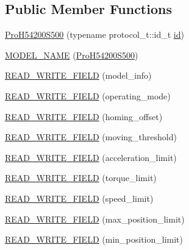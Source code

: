 \subsection*{Public Member Functions}
\begin{DoxyCompactItemize}
\item 
\hyperlink{classdynamixel_1_1servos_1_1_pro_h54200_s500_ac543de875d6b8b796b5ac5262f812b09}{Pro\+H54200\+S500} (typename protocol\+\_\+t\+::id\+\_\+t \hyperlink{classdynamixel_1_1servos_1_1_servo_a2d022081672e25a7bb57b76706e1cc57}{id})
\item 
\hyperlink{classdynamixel_1_1servos_1_1_pro_h54200_s500_ad276df94bdb9b19df85e59d4dda3cf92}{M\+O\+D\+E\+L\+\_\+\+N\+A\+ME} (\hyperlink{classdynamixel_1_1servos_1_1_pro_h54200_s500}{Pro\+H54200\+S500})
\item 
\hyperlink{classdynamixel_1_1servos_1_1_pro_h54200_s500_a76521c62777c96b58b76d6c52848fd19}{R\+E\+A\+D\+\_\+\+W\+R\+I\+T\+E\+\_\+\+F\+I\+E\+LD} (model\+\_\+info)
\item 
\hyperlink{classdynamixel_1_1servos_1_1_pro_h54200_s500_a18ee4956e74fe002314cb858cc093526}{R\+E\+A\+D\+\_\+\+W\+R\+I\+T\+E\+\_\+\+F\+I\+E\+LD} (operating\+\_\+mode)
\item 
\hyperlink{classdynamixel_1_1servos_1_1_pro_h54200_s500_ac34e20a41f8d85f4c5bfbd12f20d0a57}{R\+E\+A\+D\+\_\+\+W\+R\+I\+T\+E\+\_\+\+F\+I\+E\+LD} (homing\+\_\+offset)
\item 
\hyperlink{classdynamixel_1_1servos_1_1_pro_h54200_s500_aebfd320b1d34de855f421d2cdd78ebb6}{R\+E\+A\+D\+\_\+\+W\+R\+I\+T\+E\+\_\+\+F\+I\+E\+LD} (moving\+\_\+threshold)
\item 
\hyperlink{classdynamixel_1_1servos_1_1_pro_h54200_s500_abd9772c54c2f67273a91219455b7bdd4}{R\+E\+A\+D\+\_\+\+W\+R\+I\+T\+E\+\_\+\+F\+I\+E\+LD} (acceleration\+\_\+limit)
\item 
\hyperlink{classdynamixel_1_1servos_1_1_pro_h54200_s500_aa887fe7ecd9d57a4277d39f9481a49d2}{R\+E\+A\+D\+\_\+\+W\+R\+I\+T\+E\+\_\+\+F\+I\+E\+LD} (torque\+\_\+limit)
\item 
\hyperlink{classdynamixel_1_1servos_1_1_pro_h54200_s500_acc5581b020cf8aa18c1b7bab65e57247}{R\+E\+A\+D\+\_\+\+W\+R\+I\+T\+E\+\_\+\+F\+I\+E\+LD} (speed\+\_\+limit)
\item 
\hyperlink{classdynamixel_1_1servos_1_1_pro_h54200_s500_af4a60c5159794e50384f9a38c096fe40}{R\+E\+A\+D\+\_\+\+W\+R\+I\+T\+E\+\_\+\+F\+I\+E\+LD} (max\+\_\+position\+\_\+limit)
\item 
\hyperlink{classdynamixel_1_1servos_1_1_pro_h54200_s500_ad7a7a4b1a95ab7028bcb1883cbb095c8}{R\+E\+A\+D\+\_\+\+W\+R\+I\+T\+E\+\_\+\+F\+I\+E\+LD} (min\+\_\+position\+\_\+limit)

\end{DoxyCompactItemize}
